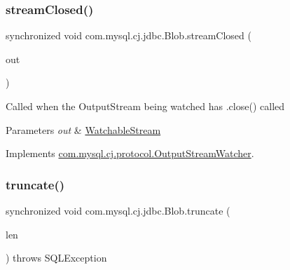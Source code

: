 \mbox{\label{classcom_1_1mysql_1_1cj_1_1jdbc_1_1_blob_a891c76fb3123f5d9f736e05d50ed1fe8}} 
\subsubsection{\texorpdfstring{stream\+Closed()}{streamClosed()}\hspace{0.1cm}{\footnotesize\ttfamily [2/2]}}
{\footnotesize\ttfamily synchronized void com.\+mysql.\+cj.\+jdbc.\+Blob.\+stream\+Closed (\begin{DoxyParamCaption}\item[{\mbox{\hyperlink{interfacecom_1_1mysql_1_1cj_1_1protocol_1_1_watchable_stream}{Watchable\+Stream}}}]{out }\end{DoxyParamCaption})}

Called when the Output\+Stream being watched has .close() called


\begin{DoxyParams}{Parameters}
{\em out} & \mbox{\hyperlink{}{Watchable\+Stream}} \\
\hline
\end{DoxyParams}


Implements \mbox{\hyperlink{interfacecom_1_1mysql_1_1cj_1_1protocol_1_1_output_stream_watcher_ab830e1917ebb2d14757c5fd1f5dc35ab}{com.\+mysql.\+cj.\+protocol.\+Output\+Stream\+Watcher}}.

\mbox{\label{classcom_1_1mysql_1_1cj_1_1jdbc_1_1_blob_a423c316889dc06f59cbaee6f77c6401f}} 
\subsubsection{\texorpdfstring{truncate()}{truncate()}}
{\footnotesize\ttfamily synchronized void com.\+mysql.\+cj.\+jdbc.\+Blob.\+truncate (\begin{DoxyParamCaption}\item[{long}]{len }\end{DoxyParamCaption}) throws S\+Q\+L\+Exception}

